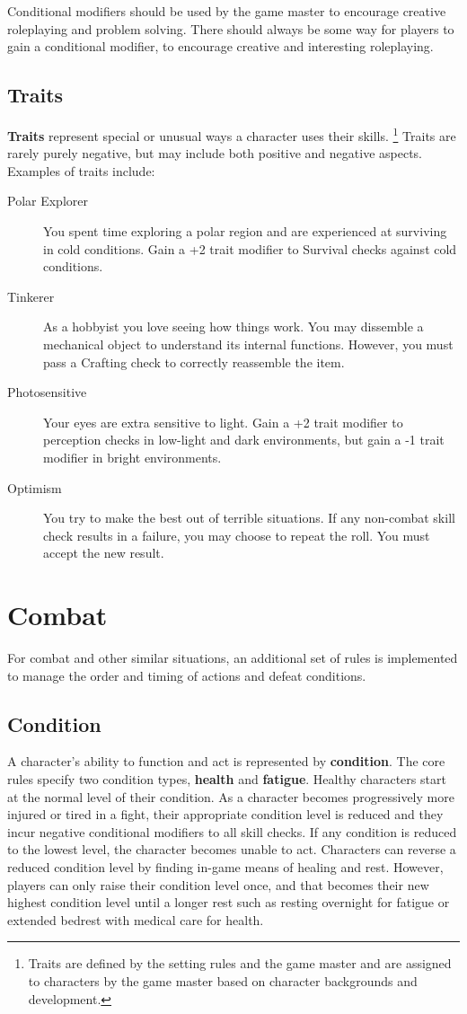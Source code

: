 \documentclass[11pt]{article}
\begin{document}
Conditional modifiers should be used by the game master to encourage creative roleplaying and problem solving.
There should always be some way for players to gain a conditional modifier, to encourage creative and interesting roleplaying.

\subsection{Traits}
\textbf{Traits} represent special or unusual ways a character uses their skills.
\footnote{Traits are defined by the setting rules and the game master and are assigned to characters by the game master based on character backgrounds and development.}
Traits are rarely purely negative, but may include both positive and negative aspects.
Examples of traits include:

\begin{description}
	\item[Polar Explorer]You spent time exploring a polar region and are experienced at surviving in cold conditions. Gain a +2 trait modifier to Survival checks against cold conditions.
	\item[Tinkerer]As a hobbyist you love seeing how things work. You may dissemble a mechanical object to understand its internal functions. However, you must pass a Crafting check to correctly reassemble the item.
	\item[Photosensitive]Your eyes are extra sensitive to light. Gain a +2 trait modifier to perception checks in low-light and dark environments, but gain a -1 trait modifier in bright environments.
	\item[Optimism]You try to make the best out of terrible situations. If any non-combat skill check results in a failure, you may choose to repeat the roll. You must accept the new result.
\end{description}

\section{Combat}
For combat and other similar situations, an additional set of rules is implemented to manage the order and timing of actions and defeat conditions.

\subsection{Condition}
A character's ability to function and act is represented by \textbf{condition}.
The core rules specify two condition types, \textbf{health} and \textbf{fatigue}.
Healthy characters start at the normal level of their condition.
As a character becomes progressively more injured or tired in a fight, their appropriate condition level is reduced and they incur negative conditional modifiers to all skill checks.
If any condition is reduced to the lowest level, the character becomes unable to act.
Characters can reverse a reduced condition level by finding in-game means of healing and rest.
However, players can only raise their condition level once, and that becomes their new highest condition level until a longer rest such as resting overnight for fatigue or extended bedrest with medical care for health.
\end{document}
